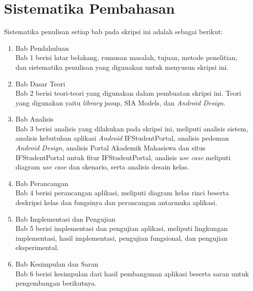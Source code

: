 \section{Sistematika Pembahasan}
\label{sec:sispem}
Sistematika penulisan setiap bab pada skripsi ini adalah sebagai berikut:

\begin{enumerate}
  \item Bab Pendahuluan \\
  Bab 1 berisi latar belakang, rumusan masalah, tujuan, metode penelitian,
  dan sistematika penulisan yang digunakan untuk menyusun skripsi ini.
  \item Bab Dasar Teori \\
  Bab 2 berisi teori-teori yang digunakan dalam pembuatan skripsi ini. Teori
  yang digunakan yaitu \textit{library} jsoup, SIA Models, dan \textit{Android Design}.
  \item Bab Analisis \\
  Bab 3 berisi analisis yang dilakukan pada skripsi ini, meliputi analisis sistem, analisis kebutuhan aplikasi \textit{Android} IFStudentPortal, analisis pedoman \textit{Android Design}, analisis Portal Akademik Mahasiswa dan situs IFStudentPortal untuk fitur IFStudentPortal, analisis \textit{use case} meliputi diagram \textsl{use case} dan skenario, serta analisis desain kelas. 
  \item Bab Perancangan \\
  Bab 4 berisi perancangan aplikasi, meliputi diagram kelas rinci beserta deskripsi kelas dan fungsinya dan perancangan antarmuka aplikasi.   
  \item Bab Implementasi dan Pengujian \\
  Bab 5 berisi implementasi dan pengujian aplikasi, meliputi lingkungan implementasi, hasil implementasi, pengujian fungsional, dan pengujian eksperimental.
  \item Bab Kesimpulan dan Saran \\
  Bab 6 berisi kesimpulan dari hasil pembangunan aplikasi beserta saran untuk pengembangan berikutnya.
\end{enumerate}

